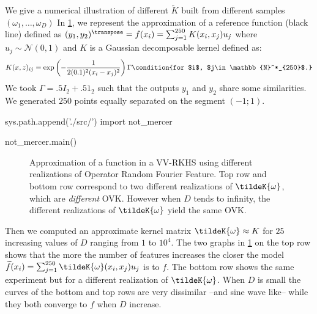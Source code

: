 We give a numerical illustration of different $\tilde{K}$ built from different
samples $(\omega_1, \ldots, \omega_D)$ In \cref{fig:not_Mercer}, we represent
the approximation of  a reference function (black line) defined as $(y_1,
y_2)^\transpose = f(x_i)=\sum_{j=1}^{250}K(x_i,x_j)u_j$ where
$u_j\sim\mathcal{N}(0,1)$ and $K$ is a Gaussian decomposable kernel defined as:
\begin{dmath*}
    K(x,z)_{ij}=\exp\left(-\frac{1}{2(0.1)^2(x_i - x_j)^2}\right)\Gamma
    \condition{for $i$, $j\in\mathbb{N}^*_{250}$.}
\end{dmath*}
We took $\Gamma=.5 I_2 +.5 1_2$ such that the outputs $y_1$ and $y_2$ share
some similarities.  We generated $250$ points equally separated on the segment
$(-1;1)$.
\begin{pycode}
sys.path.append('./src/')
import not_mercer

not_mercer.main()
\end{pycode}
\begin{figure}[htb]
    \caption[Approximation of a function in a vv-RKHS using different
    realizations of Operator Random Fourier Feature]{Approximation of a
    function in a VV-RKHS using different realizations of Operator Random
    Fourier Feature.
    Top row and bottom row correspond to two different realizations of
    $\tildeK{\omega}$, which are \emph{different} \acl{OVK}. However when $D$
    tends to infinity, the different realizations of $\tildeK{\omega}$ yield
    the same \acs{OVK}.}
    \label{fig:not_Mercer}
\end{figure}
 Then we computed an approximate kernel matrix $\tildeK{\omega}\approx K$ for
 $25$ increasing values of $D$ ranging from $1$ to $10^4$. The two graphs in
 \cref{fig:not_Mercer} on the top row shows that the more the number of
 features increases the closer the model
 $\widetilde{f}(x_i)=\sum_{j=1}^{250}\tildeK{\omega}(x_i,x_j)u_j$ is to $f$.
 The bottom row shows the same experiment but for a different realization of
 $\tildeK{\omega}$. When $D$ is small the curves of the bottom and top rows are
 very dissimilar --and sine wave like-- while they both converge to $f$ when
 $D$ increase.
